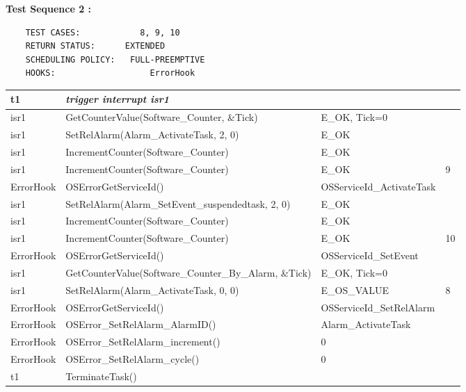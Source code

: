 \documentclass[10pt]{article}
\newlength{\Li}\settowidth{\Li}{Running}
\newlength{\Lii}\setlength{\Lii}{7cm}
\newlength{\Liiii}\setlength{\Liiii}{0.9cm}
\newlength{\Liii}\setlength{\Liii}{\textwidth} \addtolength{\Liii}{-\Li} \addtolength{\Liii}{-\Lii} \addtolength{\Liii}{-\Liiii}
\begin{document}
	\textbf{Test Sequence 2 :}
	\begin{lstlisting}
	TEST CASES:		       8, 9, 10
	RETURN STATUS:	  	EXTENDED
	SCHEDULING POLICY:   FULL-PREEMPTIVE
	HOOKS:			         ErrorHook
	\end{lstlisting}
	
	
	\begin{supertabular}{|p{\Li}|p{\Lii}|p{\Liii}|p{\Liiii}|} \hline 
	t1	& \textit{trigger interrupt isr1}									& 						& \\ \hline
	isr1	& GetCounterValue(Software\_Counter, \&Tick)					& E\_OK, Tick=0			& \\ \hline
	isr1	& SetRelAlarm(Alarm\_ActivateTask, 2, 0)						& E\_OK					& \\ \hline
	isr1	& IncrementCounter(Software\_Counter)							& E\_OK					& \\ \hline
	isr1	& IncrementCounter(Software\_Counter)							& E\_OK					& 9 \\ \hline
	ErrorHook		& OSErrorGetServiceId()								& OSServiceId\_ActivateTask	& \\ \hline
	isr1	& SetRelAlarm(Alarm\_SetEvent\_suspendedtask, 2, 0)				& E\_OK					& \\ \hline
	isr1	& IncrementCounter(Software\_Counter)							& E\_OK					& \\ \hline
	isr1	& IncrementCounter(Software\_Counter)							& E\_OK					& 10 \\ \hline
	ErrorHook		& OSErrorGetServiceId()								& OSServiceId\_SetEvent		& \\ \hline
	isr1	& GetCounterValue(Software\_Counter\_By\_Alarm, \&Tick)			& E\_OK, Tick=0			& \\ \hline
	isr1	& SetRelAlarm(Alarm\_ActivateTask, 0, 0)						& E\_OS\_VALUE			& 8 \\ \hline
	ErrorHook		& OSErrorGetServiceId()								& OSServiceId\_SetRelAlarm	& \\ \hline
	ErrorHook		& OSError\_SetRelAlarm\_AlarmID()						& Alarm\_ActivateTask		& \\ \hline
	ErrorHook		& OSError\_SetRelAlarm\_increment()					& 0						& \\ \hline
	ErrorHook		& OSError\_SetRelAlarm\_cycle()						& 0						& \\ \hline
	t1	& TerminateTask()											& 						& \\ \hline
	\end{supertabular}\\
	
\end{document}
